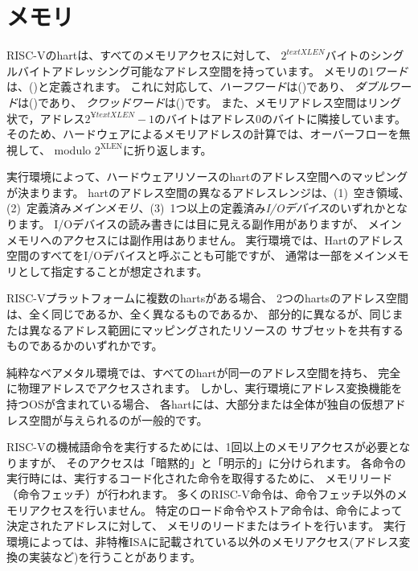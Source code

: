 \section{メモリ}

RISC-Vのhartは、すべてのメモリアクセスに対して、
$2^{text{XLEN}}$バイトのシングルバイトアドレッシング可能なアドレス空間を持っています。 
メモリの1{\em ワード}は、()と定義されます。
これに対応して、{\em ハーフワード}は()であり、
{\em ダブルワード}は()であり、
{\em クワッドワード}は()です。
また、メモリアドレス空間はリング状で，アドレス$2^{¥text{XLEN}}-1$のバイトはアドレス0のバイトに隣接しています。
そのため、ハードウェアによるメモリアドレスの計算では、オーバーフローを無視して、
modulo $2^{\text{XLEN}}$に折り返します。

実行環境によって、ハードウェアリソースのhartのアドレス空間へのマッピングが決まります。
hartのアドレス空間の異なるアドレスレンジは、(1)~空き領域、(2)~定義済み{\em メインメモリ}、(3)~1つ以上の定義済み{\em I/Oデバイス}のいずれかとなります。
I/Oデバイスの読み書きには目に見える副作用がありますが、
メインメモリへのアクセスには副作用はありません。
実行環境では、Hartのアドレス空間のすべてをI/Oデバイスと呼ぶことも可能ですが、
通常は一部をメインメモリとして指定することが想定されます。

RISC-Vプラットフォームに複数のhartsがある場合、
2つのhartsのアドレス空間は、全く同じであるか、全く異なるものであるか、
部分的に異なるが、同じまたは異なるアドレス範囲にマッピングされたリソースの
サブセットを共有するものであるかのいずれかです。

\begin{commentary}
純粋なベアメタル環境では、すべてのhartが同一のアドレス空間を持ち、
完全に物理アドレスでアクセスされます。
しかし、実行環境にアドレス変換機能を持つOSが含まれている場合、
各hartには、大部分または全体が独自の仮想アドレス空間が与えられるのが一般的です。
\end{commentary}

RISC-Vの機械語命令を実行するためには、1回以上のメモリアクセスが必要となりますが、
そのアクセスは「暗黙的」と「明示的」に分けられます。
各命令の実行時には、実行するコード化された命令を取得するために、
メモリリード（命令フェッチ）が行われます。
多くのRISC-V命令は、命令フェッチ以外のメモリアクセスを行いません。
特定のロード命令やストア命令は、命令によって決定されたアドレスに対して、
メモリのリードまたはライトを行います。
実行環境によっては、非特権ISAに記載されている以外のメモリアクセス(アドレス変換の実装など)を行うことがあります。

